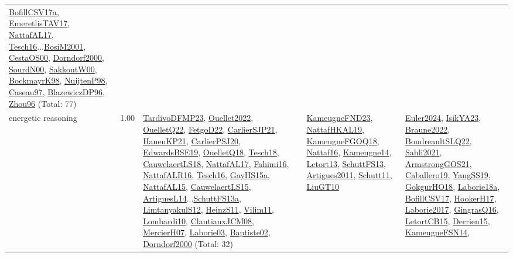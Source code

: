 {\begin{longtable}{p{3cm}r>{\raggedright\arraybackslash}p{6cm}>{\raggedright\arraybackslash}p{6cm}>{\raggedright\arraybackslash}p{8cm}}
\hyperref[detail:BofillCSV17a]{BofillCSV17a}, \hyperref[detail:EmeretlisTAV17]{EmeretlisTAV17}, \hyperref[detail:NattafAL17]{NattafAL17}, \hyperref[detail:Tesch16]{Tesch16}...\hyperref[detail:BosiM2001]{BosiM2001}, \hyperref[detail:CestaOS00]{CestaOS00}, \hyperref[detail:Dorndorf2000]{Dorndorf2000}, \hyperref[detail:SourdN00]{SourdN00}, \hyperref[detail:SakkoutW00]{SakkoutW00}, \hyperref[detail:BockmayrK98]{BockmayrK98}, \hyperref[detail:NuijtenP98]{NuijtenP98}, \hyperref[detail:Caseau97]{Caseau97}, \hyperref[detail:BlazewiczDP96]{BlazewiczDP96}, \hyperref[detail:Zhou96]{Zhou96} (Total: 77)\\
\index{energetic reasoning}\index{Algorithms!energetic reasoning}energetic reasoning &  1.00 & \hyperref[detail:TardivoDFMP23]{TardivoDFMP23}, \hyperref[detail:Ouellet2022]{Ouellet2022}, \hyperref[detail:OuelletQ22]{OuelletQ22}, \hyperref[detail:FetgoD22]{FetgoD22}, \hyperref[detail:CarlierSJP21]{CarlierSJP21}, \hyperref[detail:HanenKP21]{HanenKP21}, \hyperref[detail:CarlierPSJ20]{CarlierPSJ20}, \hyperref[detail:EdwardsBSE19]{EdwardsBSE19}, \hyperref[detail:OuelletQ18]{OuelletQ18}, \hyperref[detail:Tesch18]{Tesch18}, \hyperref[detail:CauwelaertLS18]{CauwelaertLS18}, \hyperref[detail:NattafAL17]{NattafAL17}, \hyperref[detail:Fahimi16]{Fahimi16}, \hyperref[detail:NattafALR16]{NattafALR16}, \hyperref[detail:Tesch16]{Tesch16}, \hyperref[detail:GayHS15a]{GayHS15a}, \hyperref[detail:NattafAL15]{NattafAL15}, \hyperref[detail:CauwelaertLS15]{CauwelaertLS15}, \hyperref[detail:ArtiguesL14]{ArtiguesL14}...\hyperref[detail:SchuttFS13a]{SchuttFS13a}, \hyperref[detail:LimtanyakulS12]{LimtanyakulS12}, \hyperref[detail:HeinzS11]{HeinzS11}, \hyperref[detail:Vilim11]{Vilim11}, \hyperref[detail:Lombardi10]{Lombardi10}, \hyperref[detail:ClautiauxJCM08]{ClautiauxJCM08}, \hyperref[detail:MercierH07]{MercierH07}, \hyperref[detail:Laborie03]{Laborie03}, \hyperref[detail:Baptiste02]{Baptiste02}, \hyperref[detail:Dorndorf2000]{Dorndorf2000} (Total: 32) & \hyperref[detail:KameugneFND23]{KameugneFND23}, \hyperref[detail:NattafHKAL19]{NattafHKAL19}, \hyperref[detail:KameugneFGOQ18]{KameugneFGOQ18}, \hyperref[detail:Nattaf16]{Nattaf16}, \hyperref[detail:Kameugne14]{Kameugne14}, \hyperref[detail:Letort13]{Letort13}, \hyperref[detail:SchuttFS13]{SchuttFS13}, \hyperref[detail:Artigues2011]{Artigues2011}, \hyperref[detail:Schutt11]{Schutt11}, \hyperref[detail:LiuGT10]{LiuGT10} & \hyperref[detail:Euler2024]{Euler2024}, \hyperref[detail:IsikYA23]{IsikYA23}, \hyperref[detail:Braune2022]{Braune2022}, \hyperref[detail:BoudreaultSLQ22]{BoudreaultSLQ22}, \hyperref[detail:Sahli2021]{Sahli2021}, \hyperref[detail:ArmstrongGOS21]{ArmstrongGOS21}, \hyperref[detail:Caballero19]{Caballero19}, \hyperref[detail:YangSS19]{YangSS19}, \hyperref[detail:GokgurHO18]{GokgurHO18}, \hyperref[detail:Laborie18a]{Laborie18a}, \hyperref[detail:BofillCSV17]{BofillCSV17}, \hyperref[detail:HookerH17]{HookerH17}, \hyperref[detail:Laborie2017]{Laborie2017}, \hyperref[detail:GingrasQ16]{GingrasQ16}, \hyperref[detail:LetortCB15]{LetortCB15}, \hyperref[detail:Derrien15]{Derrien15}, \hyperref[detail:KameugneFSN14]{KameugneFSN14}, 
\end{longtable}}
